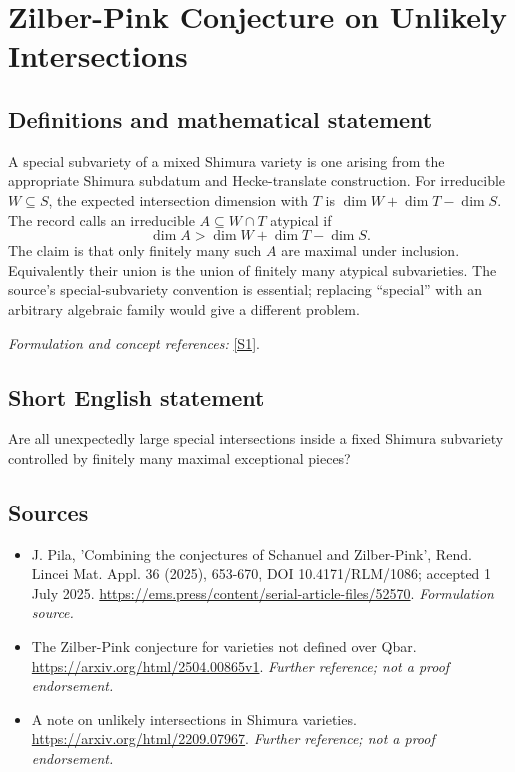 \documentclass[11pt]{article}
\begin{document}
\section*{\texorpdfstring{Zilber-Pink Conjecture on Unlikely Intersections}{Zilber-Pink Conjecture on Unlikely Intersections}}\label{30006716}
\subsection{Definitions and mathematical statement}
A special subvariety of a mixed Shimura variety is one arising from the appropriate Shimura subdatum and Hecke-translate construction. For irreducible $W\subseteq S$, the expected intersection dimension with $T$ is $\dim W+\dim T-\dim S$. The record calls an irreducible $A\subseteq W\cap T$ atypical if
\[
 \dim A>\dim W+\dim T-\dim S.
\]
The claim is that only finitely many such $A$ are maximal under inclusion. Equivalently their union is the union of finitely many atypical subvarieties. The source's special-subvariety convention is essential; replacing ``special'' with an arbitrary algebraic family would give a different problem.
\par\smallskip\textit{Formulation and concept references:} \href{https://ems.press/content/serial-article-files/52570}{[S1]}.

\subsection{Short English statement}
Are all unexpectedly large special intersections inside a fixed Shimura subvariety controlled by finitely many maximal exceptional pieces?
\subsection{Sources}
\begin{itemize}
\item[S1]J. Pila, 'Combining the conjectures of Schanuel and Zilber-Pink', Rend. Lincei Mat. Appl. 36 (2025), 653-670, DOI 10.4171/RLM/1086; accepted 1 July 2025.
\url{https://ems.press/content/serial-article-files/52570}.
\textit{Formulation source.}
\item[S2]The Zilber-Pink conjecture for varieties not defined over Qbar.
\url{https://arxiv.org/html/2504.00865v1}.
\textit{Further reference; not a proof endorsement.}
\item[S3]A note on unlikely intersections in Shimura varieties.
\url{https://arxiv.org/html/2209.07967}.
\textit{Further reference; not a proof endorsement.}
\end{itemize}
\end{document}
